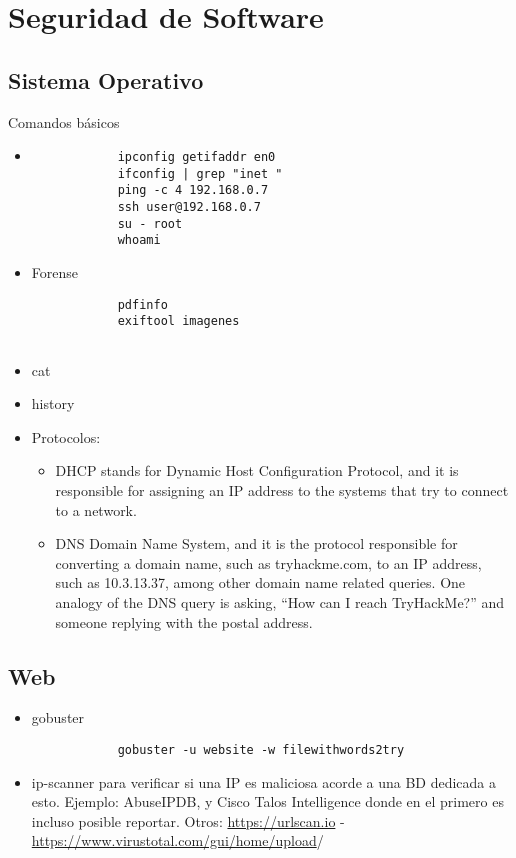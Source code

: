 \chapter{Seguridad de Software}
\begin{flushright}
    \textit{ }
\end{flushright}

\section{Sistema Operativo}
Comandos básicos
\begin{itemize}
    \item 
        \begin{lstlisting}
            ipconfig getifaddr en0 
            ifconfig | grep "inet "
            ping -c 4 192.168.0.7 
            ssh user@192.168.0.7
            su - root
            whoami
        \end{lstlisting}
     \item Forense 
      \begin{lstlisting}
            pdfinfo
            exiftool imagenes
            
        \end{lstlisting}
     \item cat 
     \item history
     \item Protocolos:
     \begin{itemize}
         \item \gls{DHCP} stands for Dynamic Host Configuration Protocol, and it is responsible for assigning an IP address to the systems that try to connect to a network.
         \item  \gls{DNS} Domain Name System, and it is the protocol responsible for converting a domain name, such as tryhackme.com, to an IP address, such as 10.3.13.37, among other domain name related queries. One analogy of the DNS query is asking, “How can I reach TryHackMe?” and someone replying with the postal address. 
     \end{itemize}
\end{itemize}
\section{Web}


\begin{itemize}
    \item \gls{gobuster}\\
        \begin{lstlisting}
            gobuster -u website -w filewithwords2try
        \end{lstlisting}
     \item \gls{ip-scanner} para verificar si una IP es maliciosa acorde a una BD dedicada a esto. Ejemplo: AbuseIPDB, y Cisco Talos Intelligence donde en el primero es incluso posible reportar. Otros: \url{https://urlscan.io} -  \url{https://www.virustotal.com/gui/home/upload}/
\end{itemize}



